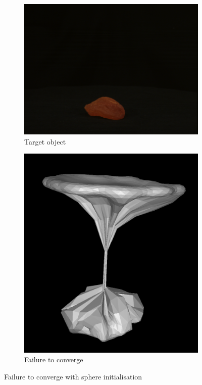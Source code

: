 \documentclass{article}
\begin{document}
\begin{figure}[h!]
  \centering
  \begin{subfigure}{0.25\textwidth}
    \centering
    \includegraphics[width=\textwidth]{images/apricot.png}
    \caption{Target object}
    \label{apricot}
  \end{subfigure}
  \hfill
  \begin{subfigure}{0.25\textwidth}
    \centering
    \includegraphics[width=\textwidth]{images/apricotfailure.png}
    \caption{Failure to converge}
    \label{apricotfailure}
  \end{subfigure}
  \caption{Failure to converge with sphere initialisation}
  \label{apricottarget}
\end{figure}
\end{document}
